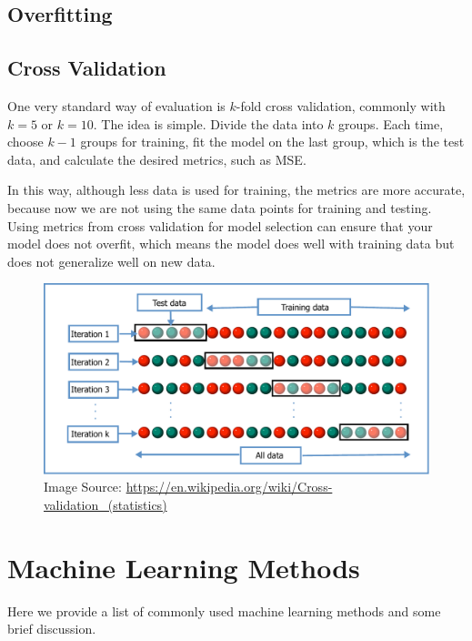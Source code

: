 \documentclass[
]{book}
\begin{document}
\hypertarget{overfitting}{%
\section{Overfitting}\label{overfitting}}

\hypertarget{cross-validation}{%
\section{Cross Validation}\label{cross-validation}}

One very standard way of evaluation is \(k\)-fold cross validation, commonly with \(k=5\) or \(k=10\). The idea is simple. Divide the data into \(k\) groups. Each time, choose \(k-1\) groups for training, fit the model on the last group, which is the test data, and calculate the desired metrics, such as MSE.

In this way, although less data is used for training, the metrics are more accurate, because now we are not using the same data points for training and testing. Using metrics from cross validation for model selection can ensure that your model does not overfit, which means the model does well with training data but does not generalize well on new data.

\begin{figure}
\centering
\includegraphics{images/K-fold_cross_validation_EN.pdf}
\caption{\label{fig:unnamed-chunk-8}Image Source: \url{https://en.wikipedia.org/wiki/Cross-validation_(statistics)}}
\end{figure}

\hypertarget{machine-learning-methods}{%
\chapter{Machine Learning Methods}\label{machine-learning-methods}}

Here we provide a list of commonly used machine learning methods and some brief discussion.
\end{document}
